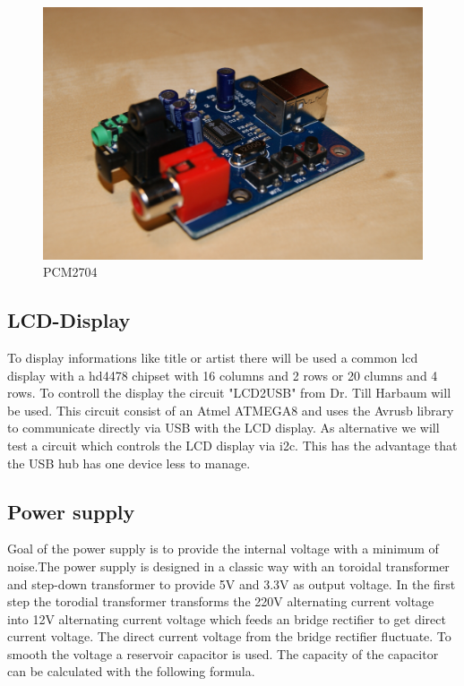 \begin{figure}[h!]
\begin{center}
\includegraphics[scale=0.35]{pictures/pcm2704}
\caption{PCM2704}
\end{center}
\end{figure}
\subsection{LCD-Display}
To display informations like title or artist there will be used a common lcd display with a hd4478 chipset with 16 columns and 2 rows or 20 clumns and 4 rows. To controll the display the circuit "LCD2USB" from Dr. Till Harbaum will be used. This circuit consist of an Atmel ATMEGA8 and uses the Avrusb library to communicate directly via USB with the LCD display. As alternative we will test a circuit which controls the LCD display via i2c. This has the advantage that the USB hub has one device less to manage.
\subsection{Power supply}
Goal of the power supply is to provide the internal voltage with a minimum of noise.The power supply is designed in a classic way with an toroidal transformer and step-down transformer to provide 5V and 3.3V as output voltage. In the first step the torodial transformer transforms the 220V alternating current voltage into 12V alternating current voltage which feeds an bridge rectifier to get direct current voltage. The direct current voltage from the bridge rectifier fluctuate. To smooth the voltage a reservoir capacitor is used. The capacity of the capacitor can be calculated with the following formula.


